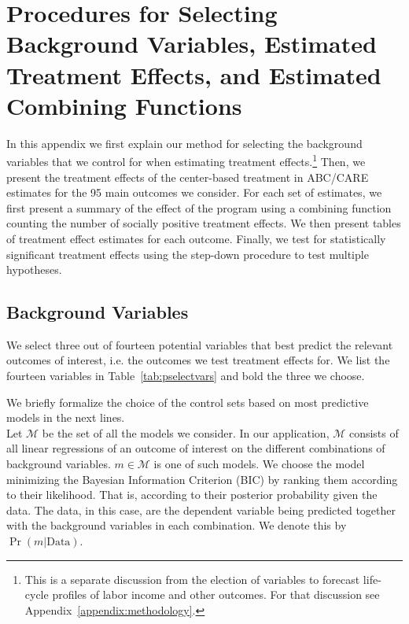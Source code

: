 \section{Procedures for Selecting Background Variables, Estimated Treatment Effects, and Estimated Combining Functions} \label{appendix:results}

\noindent In this appendix we first explain our method for selecting the background variables that we control for when estimating treatment effects.\footnote{This is a separate discussion from the election of variables to forecast life-cycle profiles of labor income and other outcomes. For that discussion see Appendix~\ref{appendix:methodology}.} Then, we present the treatment effects of the center-based treatment in ABC/CARE estimates for the 95 main outcomes we consider. For each set of estimates, we first present a summary of the effect of the program using a combining function counting the number of socially positive treatment effects. We then present tables of treatment effect estimates for each outcome. Finally, we test for statistically significant treatment effects using the step-down procedure to test multiple hypotheses.\\

\subsection{Background Variables} \label{appendix:bvariables}

\noindent We select three out of fourteen potential variables that best predict the relevant outcomes of interest, i.e. the outcomes we test treatment effects for. We list the fourteen variables in Table~\ref{tab:pselectvars} and bold the three we choose.

\singlespacing

\doublespacing

\noindent We briefly formalize the choice of the control sets based on most predictive models in the next lines.\\

\noindent Let $\mathcal{M}$ be the set of all the models we consider. In our application, $\mathcal{M}$ consists of all linear regressions of an outcome of interest on the different combinations of background variables. $m \in \mathcal{M}$ is one of such models. We choose the model minimizing the Bayesian Information Criterion (BIC) by ranking them according to their likelihood. That is, according to their posterior probability given the data. The data, in this case, are the dependent variable being predicted together with the background variables in each combination. We denote this by $\Pr( m | \text{Data} )$.\\

